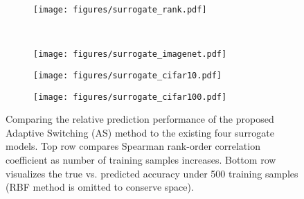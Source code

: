 \documentclass[runningheads]{llncs}
\begin{document}
\begin{figure}[t]
    \begin{subfigure}[b]{0.98\textwidth}
    \centering
    \texttt{[image: figures/surrogate\_rank.pdf]}
    \end{subfigure}\\
    \begin{subfigure}[b]{0.32\textwidth}
    \texttt{[image: figures/surrogate\_imagenet.pdf]}
    \end{subfigure}
    \begin{subfigure}[b]{0.32\textwidth}
    \texttt{[image: figures/surrogate\_cifar10.pdf]}
    \end{subfigure}
    \begin{subfigure}[b]{0.32\textwidth}
    \texttt{[image: figures/surrogate\_cifar100.pdf]}
    \end{subfigure}
    \caption{Comparing the relative prediction performance of the proposed Adaptive Switching (AS) method to the existing four surrogate models. Top row compares Spearman rank-order correlation coefficient as number of training samples increases. Bottom row visualizes the true vs. predicted accuracy under 500 training samples (RBF method is omitted to conserve space).
    \label{fig:surrogate}}
\end{figure}
\end{document}
